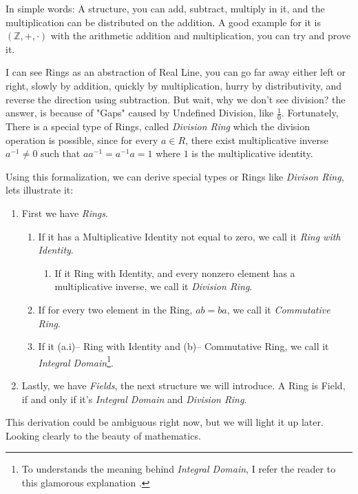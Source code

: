 In simple words: A structure, you can add, subtract, multiply in it, and the multiplication can be distributed on the addition. A good example for it is $(\mathbb{Z},+,\cdot)$ with the arithmetic addition and multiplication, you can try and prove it.

I can see Rings as an abstraction of Real Line, you can go far away either left or right, slowly by addition, quickly by multiplication, hurry by distributivity,  and reverse the direction using subtraction. But wait, why we don't see division? the answer, is because of "Gaps" caused by Undefined Division, like $\frac{1}{0}$. Fortunately, There is a special type of Rings, called {\it Division Ring} which the division operation is possible, since for every $a \in R$, there exist multiplicative inverse $a^{-1} \neq 0$ such that $aa^{-1}=a^{-1}a=1$ where $1$ is the multiplicative identity.

Using this formalization, we can derive special types or Rings like {\it Divison Ring}, lets illustrate it: \begin{enumerate}
    \item First we have {\it Rings}.
    \begin{enumerate}
        \item If it has a Multiplicative Identity not equal to zero, we call it {\it Ring with Identity}.
            \begin{enumerate}
                \item If it Ring with Identity, and every nonzero element has a multiplicative inverse, we call it {\it Division Ring}. 
            \end{enumerate}
        \item If for every two element in the Ring, $ab=ba$, we call it {\it Commutative Ring}.
        \item If it (a.i)-- Ring with Identity and (b)-- Commutative Ring, we call it {\it Integral Domain}\footnote{To understands the meaning behind {\it Integral Domain}, I refer the reader to this glamorous explanation \cite{46944}.}.
    \end{enumerate}
    \item Lastly, we have {\it Fields}, the next structure we will introduce. A Ring is Field, if and only if it's {\it Integral Domain} and {\it Division Ring}.
\end{enumerate}

This derivation could be ambiguous right now, but we will light it up later. Looking clearly to the beauty of mathematics.